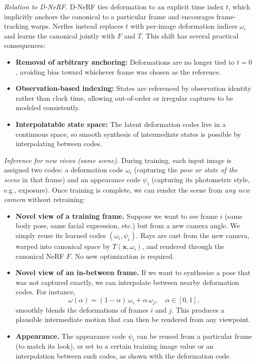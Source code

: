 \begin{enrichment}
\begin{enrichment}
        \emph{Relation to D-NeRF.}
        D-NeRF ties deformation to an explicit time index \(t\), which implicitly anchors the canonical to a particular frame and encourages frame-tracking warps. Nerfies instead replaces \(t\) with per-image deformation indices \(\omega_i\) and learns the canonical jointly with \(F\) and \(T\). This shift has several practical consequences:
        \begin{itemize}
            \item \textbf{Removal of arbitrary anchoring:} Deformations are no longer tied to \(t{=}0\), avoiding bias toward whichever frame was chosen as the reference.
            \item \textbf{Observation-based indexing:} States are referenced by observation identity rather than clock time, allowing out-of-order or irregular captures to be modeled consistently.
            \item \textbf{Interpolatable state space:} The latent deformation codes live in a continuous space, so smooth synthesis of intermediate states is possible by interpolating between codes.
        \end{itemize}
        
        \emph{Inference for new views (same scene).}
        During training, each input image is assigned two codes: a deformation code \(\omega_i\) (capturing the \emph{pose or state of the scene} in that frame) and an appearance code \(\psi_i\) (capturing its photometric style, e.g., exposure). Once training is complete, we can render the scene from \emph{any new camera} without retraining:
        
        \begin{itemize}
            \item \textbf{Novel view of a training frame.} Suppose we want to see frame \(i\) (same body pose, same facial expression, etc.) but from a new camera angle. We simply reuse its learned codes \((\omega_i,\psi_i)\). Rays are cast from the new camera, warped into canonical space by \(T(\mathbf{x},\omega_i)\), and rendered through the canonical NeRF \(F\). No new optimization is required.
            \item \textbf{Novel view of an in-between frame.} If we want to synthesize a pose that was not captured exactly, we can interpolate between nearby deformation codes. For instance,
            \[
            \omega(\alpha) = (1{-}\alpha)\,\omega_i + \alpha\,\omega_j,\quad \alpha\in[0,1],
            \]
            smoothly blends the deformations of frames \(i\) and \(j\). This produces a plausible intermediate motion that can then be rendered from any viewpoint.
            \item \textbf{Appearance.} The appearance code \(\psi_i\) can be reused from a particular frame (to match its look), or set to a certain training image value or an interpolation between such codes, as shown with the deformation code. 
        \end{itemize}
        

\end{enrichment}
\end{enrichment}
